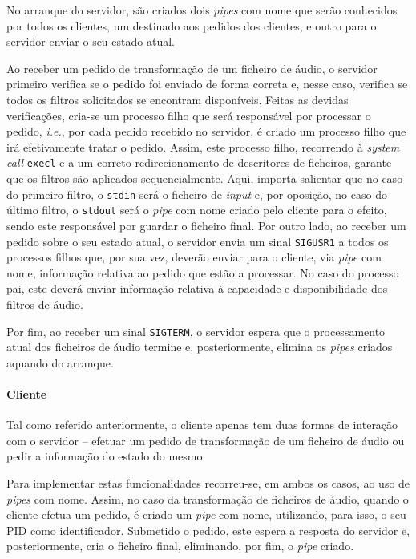 \documentclass[a4paper, 11pt]{article}
\begin{document}
No arranque do servidor, são criados dois \textit{pipes} com nome
que serão conhecidos por todos os clientes, um destinado aos pedidos dos clientes, e outro para o 
servidor enviar o seu estado atual. 

Ao receber um pedido de transformação de um ficheiro de áudio, o servidor primeiro verifica se o 
pedido foi enviado de forma correta e, nesse caso, verifica se todos os filtros solicitados se 
encontram disponíveis. Feitas as devidas verificações, cria-se um processo filho que será 
responsável por processar o pedido, \textit{i.e.}, por cada pedido recebido no servidor, é criado 
um processo filho que irá efetivamente tratar o pedido. Assim, este processo filho, recorrendo à 
\textit{system call} \texttt{execl} e a um correto redirecionamento de descritores de ficheiros, 
garante que os filtros são aplicados sequencialmente. Aqui, importa salientar que no caso do 
primeiro filtro, o \texttt{stdin} será o ficheiro de \textit{input} e, por oposição, no caso do 
último filtro, o \texttt{stdout} será o \textit{pipe} com nome criado pelo cliente para o efeito, 
sendo este responsável por guardar o ficheiro final. 
Por outro lado, ao receber um pedido sobre o seu estado atual, o servidor envia um sinal 
\texttt{SIGUSR1} a todos os processos filhos que, por sua vez, deverão enviar para o cliente, via 
\textit{pipe} com nome, informação relativa ao pedido que estão a processar. No caso do processo 
pai, este deverá enviar informação relativa à capacidade e disponibilidade dos filtros de 
áudio.

Por fim, ao receber um sinal \texttt{SIGTERM}, o servidor espera que o processamento atual dos 
ficheiros de áudio termine e, posteriormente, elimina os \textit{pipes} criados aquando do 
arranque.

\paragraph{Cliente\\}

Tal como referido anteriormente, o cliente apenas tem duas formas de interação com
o servidor -- efetuar um pedido de transformação de um ficheiro de áudio ou pedir a informação 
do estado do mesmo. 

Para implementar estas funcionalidades recorreu-se, em ambos os casos, ao uso de \textit{pipes} com 
nome. Assim, no caso da transformação de ficheiros de áudio, quando o cliente efetua um pedido, 
é criado um \textit{pipe} com nome, utilizando, para isso, o seu PID como identificador. Submetido 
o pedido, este espera a resposta do servidor e, posteriormente, cria o ficheiro final, eliminando, 
por fim, o \textit{pipe} criado.
\end{document}
